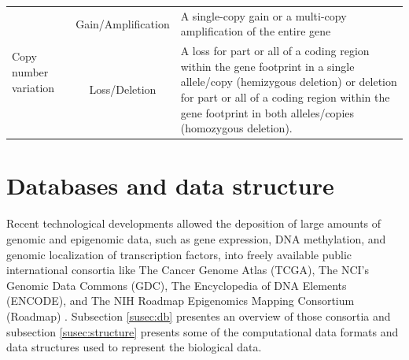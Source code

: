 \begin{landscape}
\begin{table}[]
\begin{tabular}{p{4cm}c|p{13cm}}
\multicolumn{1}{l|}{\multirow{2}{*}{Copy number variation}} & Gain/Amplification
 & A single-copy gain or a multi-copy amplification of the entire gene  \\  \cline{2-3}
\multicolumn{1}{l|}{}  & Loss/Deletion  &
A loss  for part or all of a coding region within the gene footprint in a single allele/copy (hemizygous deletion) or deletion  for part or all of a coding region within the gene footprint in both alleles/copies (homozygous deletion). \cite{comis_cnv} \\\hline
\end{tabular}
 \end{table}
 \egroup
 \end{landscape}

 \section{Databases and data structure} \label{sec:concept-data}

 Recent technological developments allowed the deposition of large amounts of genomic and epigenomic data, such as gene expression, DNA methylation, and genomic localization of transcription factors, into freely available public international consortia like The Cancer Genome Atlas (TCGA), The NCI's Genomic Data Commons (GDC), The Encyclopedia of DNA Elements (ENCODE), and The NIH Roadmap Epigenomics Mapping Consortium (Roadmap) \cite{Hawkins}.
 Subsection \ref{susec:db} presentes an overview of those consortia and subsection  \ref{susec:structure} presents
 some of the computational data formats and data structures used to represent the biological data.


